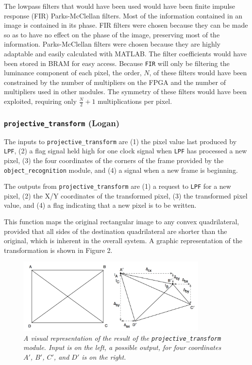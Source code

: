 \documentclass[10pt]{article}
\begin{document}
The lowpass filters that would have been used would have been finite impulse response (FIR) Parks-McClellan filters. Most of the information contained in an image is contained in its phase. FIR filters were chosen because they can be made so as to have no effect on the phase of the image, preserving most of the information. Parks-McClellan filters were chosen because they are highly adaptable and easily calculated with MATLAB. The filter coefficients would have been stored in BRAM for easy access. Because {\tt FIR} will only be filtering the luminance component of each pixel, the order, \( N \), of these filters would have been constrained by the number of multipliers on the FPGA and the number of multipliers used in other modules. The symmetry of these filters would have been exploited, requiring only \( \frac{N}{2}+1 \) multiplications per pixel.

\subsubsection{{\tt projective\_transform} (Logan)}
The inputs to {\tt projective\_transform} are (1) the pixel value last produced by {\tt LPF}, (2) a flag signal held high for one clock signal when {\tt LPF} has processed a new pixel, (3) the four coordinates of the corners of the frame provided by the {\tt object\_recognition} module, and (4) a signal when a new frame is beginning.

The outputs from {\tt projective\_transform} are (1) a request to {\tt LPF} for a new pixel, (2) the X/Y coordinates of the transformed pixel, (3) the transformed pixel value, and (4) a flag indicating that a new pixel is to be written.

This function maps the original rectangular image to any convex quadrilateral, provided that all sides of the destination quadrilateral are shorter than the original, which is inherent in the overall system. A graphic representation of the transformation is shown in Figure 2.

\begin{figure}[h!]
\centering
\includegraphics[width=0.85\textwidth]{images/arbiskew_graphic.png}
\caption{\emph{A visual representation of the result of the {\tt projective\_transform} module. Input is on the left, a possible output, for four coordinates $A\prime$, $B\prime$, $C\prime$, and $D\prime$ is on the right.}}
\end{figure}
\end{document}
